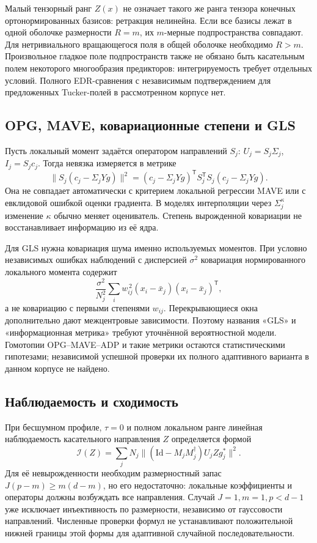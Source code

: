 \documentclass[11pt,a4paper]{article}
\numberwithin{equation}{section}
\newcommand{\Id}{\mathrm{Id}}
\newcommand{\T}{^{\mathsf T}}
\begin{document}
Малый тензорный ранг $Z(x)$ не означает такого же ранга тензора
конечных ортонормированных базисов: ретракция нелинейна.
Если все базисы лежат в одной оболочке размерности $R=m$,
их $m$-мерные подпространства совпадают. Для нетривиального
вращающегося поля в общей оболочке необходимо $R>m$.
Произвольное гладкое поле подпространств также не обязано быть
касательным полем некоторого многообразия предикторов:
интегрируемость требует отдельных условий.
Полного EDR-сравнения с независимым подтверждением для предложенных
Tucker-полей в рассмотренном корпусе нет.\cite{tucker,unified,structurednote}

\subsection{OPG, MAVE, ковариационные степени и GLS}

Пусть локальный момент задаётся оператором направлений $S_j$:
$U_j=S_j\Sigma_j$, $I_j=S_jc_j$.
Тогда невязка измеряется в метрике
\[
 \|S_j(c_j-\Sigma_jYg)\|^2
  =(c_j-\Sigma_jYg)\T S_j\T S_j(c_j-\Sigma_jYg).
\]
Она не совпадает автоматически с критерием локальной регрессии
MAVE или с евклидовой ошибкой оценки градиента.
В моделях интерполяции через $\Sigma_j^\kappa$ изменение $\kappa$
обычно меняет оцениватель. Степень вырожденной ковариации
не восстанавливает информацию из её ядра.

Для GLS нужна ковариация шума именно используемых моментов.
При условно независимых ошибках наблюдений с дисперсией $\sigma^2$
ковариация нормированного локального момента содержит
\[
 \frac{\sigma^2}{N_j^2}
 \sum_i w_{ij}^{\,2}(x_i-\bar x_j)(x_i-\bar x_j)\T,
\]
а не ковариацию с первыми степенями $w_{ij}$.
Перекрывающиеся окна дополнительно дают межцентровые зависимости.
Поэтому названия «GLS» и «информационная метрика» требуют
уточнённой вероятностной модели.
Гомотопии OPG--MAVE--ADP и такие метрики остаются статистическими
гипотезами; независимой успешной проверки их полного адаптивного
варианта в данном корпусе не найдено.\cite{unified,glm,structurednote}

\subsection{Наблюдаемость и сходимость}

При бесшумном профиле, $\tau=0$ и полном локальном ранге
линейная наблюдаемость касательного направления $Z$ определяется формой
\[
 \mathcal I(Z)=\sum_jN_j
 \|(\Id-M_jM_j^\dagger)U_jZg_j^*\|^2.
\]
Для её невырожденности необходим размерностный запас
$J(p-m)\ge m(d-m)$, но его недостаточно: локальные коэффициенты
и операторы должны возбуждать все направления.
Случай $J=1,m=1,p<d-1$ уже исключает инъективность по размерности,
независимо от гауссовости направлений.
Численные проверки формул не устанавливают положительной нижней
границы этой формы для адаптивной случайной последовательности.
\cite{structurednote}
\end{document}
